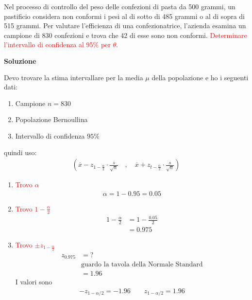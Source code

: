 \documentclass{article}  %
\theoremstyle{definition}
\begin{document}
\begin{esercizio}[Esercizio 4]
	Nel processo di controllo del peso delle confezioni di pasta da 500 grammi, un pastificio considera non conformi
	i pesi al di sotto di 485 grammi o al di sopra di 515 grammi. Per valutare l'efficienza di una confezionatrice,
	l'azienda esamina un campione di 830 confezioni e trova che 42 di esse sono non conformi. \textcolor{red}{Determinare l'intervallo di confidenza al 95$\%$
		per $\theta$}.
	\begin{center}
		\textbf{Soluzione}
	\end{center}
	Devo trovare la stima intervallare per la media $\mu$ della popolazione e ho i seguenti dati:
	\begin{enumerate}
		\item Campione $n=830$
		\item Popolazione Bernoullina
		\item Intervallo di confidenza $95\%$
	\end{enumerate}
	quindi uso:
	\begin{align*}
		\left(\overline{x}-z_{1-\frac{\alpha}{2}}\cdot \frac{s}{\sqrt{n}} \quad , \quad \overline{x}+z_{t-\frac{\alpha}{2}}\cdot \frac{s}{\sqrt{n}}\right)
	\end{align*}
	\begin{enumerate}
		\item \textcolor{red}{Trovo $\alpha$}
		      \begin{align*}
			      \alpha = 1 - 0.95 = 0.05
		      \end{align*}
		\item \textcolor{red}{Trovo $1-\frac{\alpha}{2}$}
		      \begin{align*}
			      1-\frac{\alpha}{2} & = 1 - \frac{0.05}{2} \\
			                         & = 0.975
		      \end{align*}
		\item \textcolor{red}{Trovo $\pm z_{1- \frac{\alpha}{2}}$} \\
		      \begin{align*}
			      z_{0.975} & = ?                                            \\
			                & \text{guardo la tavola della Normale Standard} \\
			                & = 1.96
		      \end{align*}
		      I valori sono
		      \begin{align*}
			      -z_{1- \alpha/2} = -1.96 \quad \quad z_{1- \alpha/2} = 1.96

\end{align*}
\end{enumerate}
\end{esercizio}
\end{document}
